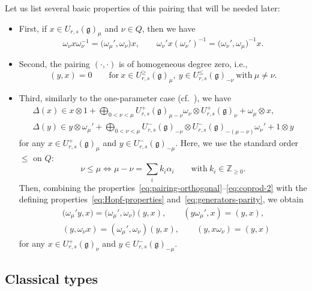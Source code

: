 \documentclass[10pt,a4paper]{amsart}
\numberwithin{equation}{section}
\newcommand{\fg}{\mathfrak{g}}
\newcommand{\BZ}{\mathbb{Z}}
\begin{document}
Let us list several basic properties of this pairing that will be needed later:
\begin{itemize}\itemsep=0pt
\item
First, if $x\in U_{r,s}(\fg)_{\mu}$ and $\nu\in Q$, then we have
\begin{displaymath}
 \omega_{\nu}x\omega_{\nu}^{-1} = \bigl(\omega_{\mu}',\omega_{\nu}\bigr)x, \qquad
 \omega_{\nu}'x(\omega_{\nu}')^{-1} = \bigl(\omega_{\nu}',\omega_{\mu}\bigr)^{-1}x.
\end{displaymath}

\item
Second, the pairing $(\cdot,\cdot)$ is of homogeneous degree zero, i.e.,
\begin{equation}\label{eq:pairing-orthogonal}
 (y,x)=0 \qquad \mathrm{for} \
 x\in U_{r,s}^{\ge}(\fg)_{\mu},\ y\in U_{r,s}^{\le}(\fg)_{-\nu}
 \ \mathrm{with} \ \mu\ne \nu.
\end{equation}

\item
Third, similarly to the one-parameter case (cf.\ \cite[Sections~6.14 and 6.15]{J}), we have
\begin{gather}\label{eq:coprod-1}
 \Delta(x) \in x\otimes 1 + \bigoplus_{0<\nu<\mu} U_{r,s}^{+}(\fg)_{\mu - \nu}\omega_{\nu} \otimes U_{r,s}^{+}(\fg)_{\nu} + \omega_{\mu} \otimes x,
\\ \label{eq:coprod-2}
 \Delta(y) \in y \otimes \omega_{\mu}' + \bigoplus_{0<\nu<\mu} U_{r,s}^{-}(\fg)_{-\nu} \otimes U_{r,s}^{-}(\fg)_{-(\mu - \nu)}\omega_{\nu}' + 1 \otimes y
\end{gather}
for any $x\in U_{r,s}^{+}(\fg)_{\mu}$ and $y \in U_{r,s}^{-}(\fg)_{-\mu}$. Here, we use the
standard order $\leq$ on $Q$:
\[
 \nu\leq \mu \Longleftrightarrow
 \mu-\nu=\sum_{i} k_i\alpha_i \qquad \mathrm{with} \ k_i\in \BZ_{\geq 0}.
\]
Then, combining the properties~\eqref{eq:pairing-orthogonal}--\eqref{eq:coprod-2} with the defining
properties~\eqref{eq:Hopf-properties} and~\eqref{eq:generators-parity}, we obtain
\begin{align*}
 & \bigl(\omega_{\mu}'y,x\bigr) = \bigl(\omega_{\mu}',\omega_{\nu}\bigr)(y,x), \qquad
 (y\omega_{\mu}',x) = (y,x), \\
 & (y,\omega_{\nu}x) = (\omega_{\mu}',\omega_{\nu})(y,x), \qquad
 (y,x\omega_{\nu}) = (y,x)
\end{align*}
for any $x\in U_{r,s}^{+}(\fg)_{\nu}$ and $y \in U_{r,s}^{-}(\fg)_{-\mu}$.
\end{itemize}

\subsection{Classical types}\label{ssec:classical-2param}
\end{document}
